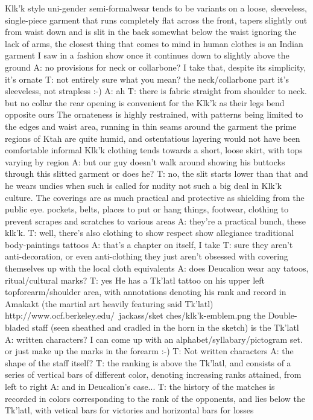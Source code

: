 Klk'k style uni-gender semi-formalwear tends to be variants on a loose, sleeveless, single-piece garment that runs completely flat across the front, tapers slightly out from waist down and is slit in the back somewhat below the waist 
ignoring the lack of arms, the closest thing that comes to mind in human clothes is an Indian garment I saw in a fashion show once
it continues down to slightly above the ground
A: no provisions for neck or collarbone?
I take that, despite its simplicity, it's ornate
T: not entirely sure what you mean?
the neck/collarbone part
it's sleeveless, not strapless :-)
A: ah
T: there is fabric straight from shoulder to neck. but no collar
the rear opening is convenient for the Klk'k as their legs bend opposite ours
The ornateness is highly restrained, with patterns being limited to the edges and waist area, running in thin seams around the garment
the prime regions of Ktah are quite humid, and ostentatious layering would not have been comfortable
informal Klk'k clothing tends towards a short, loose skirt, with tops varying by region
A: but our guy doesn't walk around showing his buttocks through this slitted garment or does he?
T: no, the slit starts lower than that
and he wears undies
when such is called for
nudity not such a big deal in Klk'k culture. The coverings are as much practical and protective as shielding from the public eye.
pockets, belts, places to put or hang things, footwear, clothing to prevent scrapes and scratches to various areas
A: they're a practical bunch, these klk'k.
T: well, there's also clothing to show respect
show allegiance
traditional body-paintings
tattoos
A: that's a chapter on itself, I take
T: sure
they aren't anti-decoration, or even anti-clothing
they just aren't obsessed with covering themselves up with the local cloth equivalents
A: does Deucalion wear any tatoos, ritual/cultural marks?
T: yes
He has a Tk'latl tattoo on his upper left topforearm/shoulder area, with annotations denoting his rank and record in Amakakt (the martial art heavily featuring said Tk'latl)
http://www.ocf.berkeley.edu/~jackass/sket ches/klk'k-emblem.png
the Double-bladed staff (seen sheathed and cradled in the horn in the sketch) is the Tk'latl
A: written characters? I can come up with an alphabet/syllabary/pictogram set.
or just make up the marks in the forearm :-)
T: Not written characters
A: the shape of the staff itself?
T: the ranking is above the Tk'latl, and consists of a series of vertical bars of different color, denoting increasing ranks attained, from left to right
A: and in Deucalion's case...
T: the history of the matches is recorded in colors corresponding to the rank of the opponents, and lies below the Tk'latl, with vetical bars for victories and horizontal bars for losses
